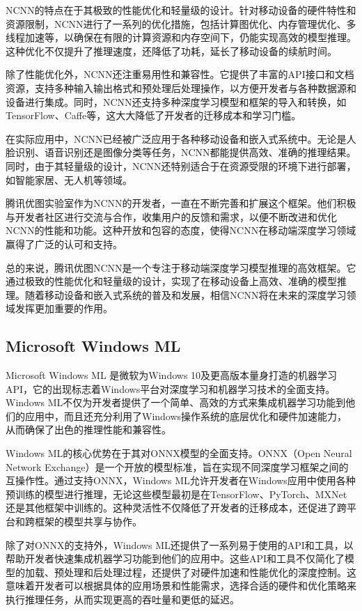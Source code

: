 NCNN的特点在于其极致的性能优化和轻量级的设计。针对移动设备的硬件特性和资源限制，NCNN进行了一系列的优化措施，包括计算图优化、内存管理优化、多线程加速等，以确保在有限的计算资源和内存空间下，仍能实现高效的模型推理。这种优化不仅提升了推理速度，还降低了功耗，延长了移动设备的续航时间。

除了性能优化外，NCNN还注重易用性和兼容性。它提供了丰富的API接口和文档资源，支持多种输入输出格式和预处理后处理操作，以方便开发者与各种数据源和设备进行集成。同时，NCNN还支持多种深度学习模型和框架的导入和转换，如TensorFlow、Caffe等，这大大降低了开发者的迁移成本和学习门槛。

在实际应用中，NCNN已经被广泛应用于各种移动设备和嵌入式系统中。无论是人脸识别、语音识别还是图像分类等任务，NCNN都能提供高效、准确的推理结果。同时，由于其轻量级的设计，NCNN还特别适合于在资源受限的环境下进行部署，如智能家居、无人机等领域。

腾讯优图实验室作为NCNN的开发者，一直在不断完善和扩展这个框架。他们积极与开发者社区进行交流与合作，收集用户的反馈和需求，以便不断改进和优化NCNN的性能和功能。这种开放和包容的态度，使得NCNN在移动端深度学习领域赢得了广泛的认可和支持。

总的来说，腾讯优图NCNN是一个专注于移动端深度学习模型推理的高效框架。它通过极致的性能优化和轻量级的设计，实现了在移动设备上高效、准确的模型推理。随着移动设备和嵌入式系统的普及和发展，相信NCNN将在未来的深度学习领域发挥更加重要的作用。

\subsection{Microsoft Windows ML}

Microsoft Windows ML 是微软为Windows 10及更高版本量身打造的机器学习API，它的出现标志着Windows平台对深度学习和机器学习技术的全面支持。Windows ML不仅为开发者提供了一个简单、高效的方式来集成机器学习功能到他们的应用中，而且还充分利用了Windows操作系统的底层优化和硬件加速能力，从而确保了出色的推理性能和兼容性。

Windows ML的核心优势在于其对ONNX模型的全面支持。ONNX（Open Neural Network Exchange）是一个开放的模型标准，旨在实现不同深度学习框架之间的互操作性。通过支持ONNX，Windows ML允许开发者在Windows应用中使用各种预训练的模型进行推理，无论这些模型最初是在TensorFlow、PyTorch、MXNet还是其他框架中训练的。这种灵活性不仅降低了开发者的迁移成本，还促进了跨平台和跨框架的模型共享与协作。

除了对ONNX的支持外，Windows ML还提供了一系列易于使用的API和工具，以帮助开发者快速集成机器学习功能到他们的应用中。这些API和工具不仅简化了模型的加载、预处理和后处理过程，还提供了对硬件加速和性能优化的深度控制。这意味着开发者可以根据具体的应用场景和性能需求，选择合适的硬件和优化策略来执行推理任务，从而实现更高的吞吐量和更低的延迟。

